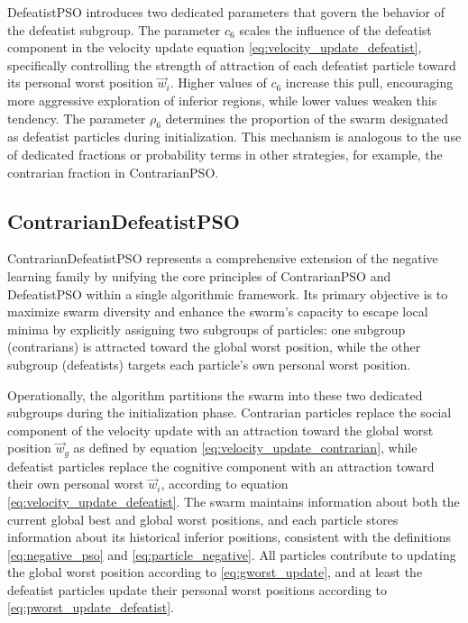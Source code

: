 {DefeatistPSO introduces two dedicated parameters that govern the behavior of the defeatist subgroup. The parameter  $c_6$ scales the influence of the defeatist component in the velocity update equation \eqref{eq:velocity_update_defeatist}, specifically controlling the strength of attraction of each defeatist particle toward its personal worst position $\vec{w}_i$. Higher values of $c_6$ increase this pull, encouraging more aggressive exploration of inferior regions, while lower values weaken this tendency.
The parameter $\rho_6$ determines the proportion of the swarm designated as defeatist particles during initialization. This mechanism is analogous to the use of dedicated fractions or probability terms in other strategies, for example, the contrarian fraction in ContrarianPSO.


\subsection{ContrarianDefeatistPSO}

ContrarianDefeatistPSO represents a comprehensive extension of the negative learning family by unifying the core principles of ContrarianPSO and DefeatistPSO within a single algorithmic framework. Its primary objective is to maximize swarm diversity and enhance the swarm’s capacity to escape local minima by explicitly assigning two subgroups of particles: one subgroup (contrarians) is attracted toward the global worst position, while the other subgroup (defeatists) targets each particle’s own personal worst position.

Operationally, the algorithm partitions the swarm into these two dedicated subgroups during the initialization phase. Contrarian particles replace the social component of the velocity update with an attraction toward the global worst position $\vec{w}_g$ as defined by equation \eqref{eq:velocity_update_contrarian}, while defeatist particles replace the cognitive component with an attraction toward their own personal worst $\vec{w}_i$, according to equation \eqref{eq:velocity_update_defeatist}.
The swarm maintains information about both the current global best and global worst positions, and each particle stores information about its historical inferior positions, consistent with the definitions \eqref{eq:negative_pso} and \eqref{eq:particle_negative}. All particles contribute to updating the global worst position according to \eqref{eq:gworst_update}, and at least the defeatist particles update their personal worst positions according to \eqref{eq:pworst_update_defeatist}.

}
